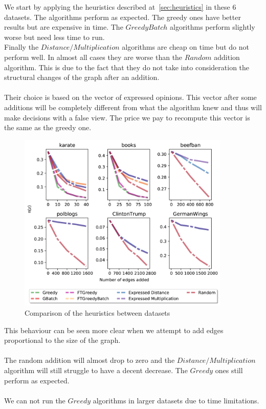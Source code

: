 \noindent We start by applying the heuristics described at~\ref{sec:heuristics} in these 6 datasets. The algorithms perform as expected. The greedy ones have better results but are expensive in time. The $Greedy Batch$ algorithms perform slightly worse but need less time to run. 
\\
Finally the $Distance/Multiplication$ algorithms are cheap on time but do not perform well. 
In almost all cases they are worse than the $Random$ addition algorithm.
This is due to the fact that they do not take into consideration the structural  changes of the graph after an addition. 
\\
\\
Their choice is based on the vector of expressed opinions. This vector after some additions will be completely different from what the algorithm knew and thus will make decisions with a false view. The price we pay to recompute this vector is the same as the greedy one.
\clearpage

\begin{figure}[!htbp]
	\centering
	\captionsetup{justification=centering,margin=2cm}
	\includegraphics[width=0.90\textwidth]{Figures/heuristics_big}
	\caption{Comparison of the heuristics between datasets}
	\label{fig:heuristics_bigl}
\end{figure}

\vspace{20pt}

\noindent This behaviour can be seen more clear when we attempt to add edges proportional to the size of the graph. 
\\
\\
The random addition will almost drop to zero and the $Distance/Multiplication$ algorithm will still struggle to have a decent decrease. The $Greedy$ ones still perform as expected.
\\
\\ 
We can not run the $Greedy$ algorithms in larger datasets due to time limitations.
\clearpage


